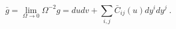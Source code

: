 \begin{equation}
 \bar g = \lim_{\Omega \to 0} \Omega^{-2} g
        = du dv + \sum_{i,j} \bar C_{ij} (u) dy^i dy^j ~.
\label{scalemetric}
\end{equation}

